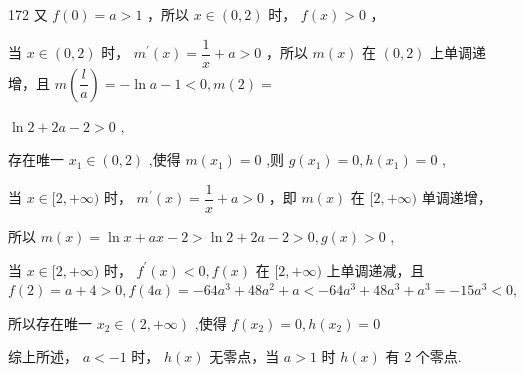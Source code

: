 \begin{enumerate}
\begin{enumerate}
\begin{jieda}
\begin{enumerate}
\begin{dingautolist}{172}
                    又 $f\left( 0\right)  = a > 1$ ，所以 $x \in  \left( {0,2}\right)$ 时， $f\left( x\right)  > 0$ ，
                    
                    当 $x \in  \left( {0,2}\right)$ 时， ${m}^{\prime }\left( x\right)  = \dfrac{1}{x} + a > 0$ ，所以 $m\left( x\right)$ 在 $\left( {0,2}\right)$ 上单调递增，且 $m\left( \dfrac{l}{a}\right)  =  - \ln a - 1 < 0,m\left( 2\right)  =$
                    
                    $\ln 2 + {2a} - 2 > 0$ ,
                    
                    存在唯一 ${x}_{1} \in  \left( {0,2}\right)$ ,使得 $m\left( {x}_{1}\right)  = 0$ ,则 $g\left( {x}_{1}\right)  = 0,h\left( {x}_{1}\right)  = 0$ ,
                    
                    当 $x \in  \lbrack 2, + \infty )$ 时， ${m}^{\prime }\left( x\right)  = \dfrac{1}{x} + a > 0$ ，即 $m\left( x\right)$ 在 $\lbrack 2, + \infty )$ 单调递增，
                    
                    所以 $m\left( x\right)  = \ln x + {ax} - 2 > \ln 2 + {2a} - 2 > 0,g\left( x\right)  > 0$ ,
                    
                    当 $x \in  \lbrack 2, + \infty )$ 时， ${f}^{\prime }\left( x\right)  < 0,f\left( x\right)$ 在 $\lbrack 2, + \infty )$ 上单调递减，且 $f\left( 2\right)  = a + 4 > 0,f\left( {4a}\right)  =  - {64}{a}^{3} + {48}{a}^{2} + a <  - {64}{a}^{3} + {48}{a}^{3} + {a}^{3} =  - {15}{a}^{3} < 0,$
                    
                    所以存在唯一 ${x}_{2} \in  \left( {2, + \infty }\right)$ ,使得 $f\left( {x}_{2}\right)  = 0,h\left( {x}_{2}\right)  = 0$ 
                \end{dingautolist}
                综上所述， $a <  - 1$ 时， $h\left( x\right)$ 无零点，当 $a > 1$ 时 $h\left( x\right)$ 有 2 个零点.
            \end{enumerate}
        \end{jieda} 
        

\end{enumerate}
\end{enumerate}
